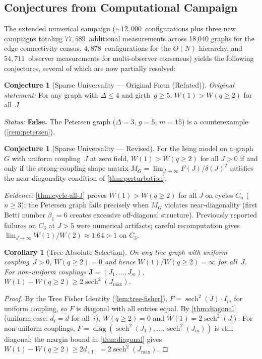 \documentclass[11pt]{article}
\newtheorem{corollary}[theorem]{Corollary}
\theoremstyle{definition}
\newtheorem{conjecture}[theorem]{Conjecture}
\theoremstyle{remark}
\begin{document}
\subsection{Conjectures from Computational Campaign}

The extended numerical campaign ($\sim 12{,}000$~configurations plus three new
campaigns totaling $77{,}589$~additional measurements across 18,040 graphs for the
edge connectivity census, $4{,}878$~configurations for the $O(N)$ hierarchy, and
$54{,}711$~observer measurements for multi-observer consensus)
yields the following conjectures, several of which are now partially resolved:

\begin{conjecture}[Sparse Universality --- Original Form (Refuted)]
\label{conj:sparse}
\emph{Original statement:} For any graph with $\Delta \leq 4$ and
girth~$g \geq 5$, $W(1) > W(q \geq 2)$ for all~$J$.

\emph{Status:} \textbf{False.} The Petersen graph ($\Delta = 3$, $g = 5$,
$m = 15$) is a counterexample (\cref{rem:petersen}).
\end{conjecture}

\begin{conjecture}[Sparse Universality --- Revised]
\label{conj:sparse-v2}
For the Ising model on a graph~$G$ with uniform coupling~$J$ at zero field,
$W(1) > W(q \geq 2)$ for all $J > 0$ if and only if the strong-coupling
shape matrix $M_G = \lim_{J \to \infty} F(J)/\delta(J)^2$ satisfies
the near-diagonality condition of \cref{thm:perturbation}.
\end{conjecture}

\noindent\emph{Evidence:} \cref{thm:cycle-all-J} proves
$W(1) > W(q \geq 2)$ for all $J$ on cycles $C_n$ ($n \geq 3$); the Petersen
graph fails precisely when $M_G$ violates near-diagonality (first Betti
number $\beta_1 = 6$ creates excessive off-diagonal structure).
Previously reported failures on $C_3$ at $J > 5$ were numerical artifacts;
careful recomputation gives $\lim_{J \to \infty} W(1)/W(2) \approx 1.64 > 1$
on $C_3$.

\begin{corollary}[Tree Absolute Selection]
\label{cor:tree-absolute}
On any tree graph with uniform coupling~$J > 0$,
$W(q \geq 2) = 0$ and hence $W(1)/W(q \geq 2) = \infty$ for all~$J$.
For non-uniform couplings $\mathbf{J} = (J_1, \ldots, J_m)$,
$W(1) - W(q \geq 2) \geq 2\operatorname{sech}^2(J_{\max})$.
\end{corollary}

\begin{proof}
By the Tree Fisher Identity (\cref{lem:tree-fisher}), $F = \operatorname{sech}^2(J) \cdot I_m$
for uniform coupling, so $F$ is diagonal with all entries equal. By
\cref{thm:diagonal} (uniform case: $d_i = d$ for all~$i$),
$W(q \geq 2) = 0$ and $W(1) = 2\operatorname{sech}^2(J)$.
For non-uniform couplings, $F = \operatorname{diag}(\operatorname{sech}^2(J_1),
\ldots, \operatorname{sech}^2(J_m))$ is still diagonal; the margin bound
in \cref{thm:diagonal}
gives $W(1) - W(q \geq 2) \geq 2d_{(1)} = 2\operatorname{sech}^2(J_{\max})$.
\end{proof}
\end{document}
